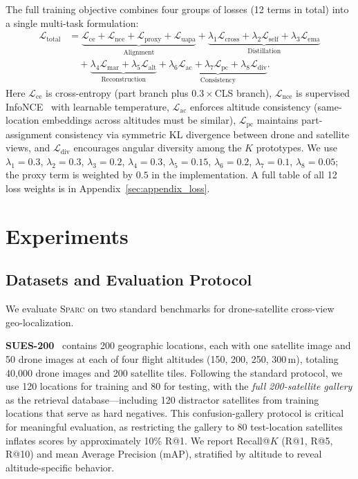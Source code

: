 \documentclass[sigconf, anonymous, review]{acmart}
\newcommand{\ours}{\textsc{Sparc}}
\newcommand{\loss}{\mathcal{L}}
\begin{document}
The full training objective combines four groups of losses (12 terms in total) into a single multi-task formulation:
\begin{equation}
\begin{aligned}
\loss_\text{total}
&= \underbrace{\loss_\text{ce} + \loss_\text{nce} + \loss_\text{proxy} + \loss_\text{uapa}}_{\text{Alignment}}
+ \underbrace{\lambda_1 \loss_\text{cross} + \lambda_2 \loss_\text{self} + \lambda_3 \loss_\text{ema}}_{\text{Distillation}} \\
&\quad + \underbrace{\lambda_4 \loss_\text{mar} + \lambda_5 \loss_\text{alt}}_{\text{Reconstruction}}
+ \underbrace{\lambda_6 \loss_\text{ac} + \lambda_7 \loss_\text{pc} + \lambda_8 \loss_\text{div}}_{\text{Consistency}}.
\end{aligned}
\label{eq:total}
\end{equation}
Here $\loss_\text{ce}$ is cross-entropy (part branch plus $0.3{\times}$CLS branch), $\loss_\text{nce}$ is supervised InfoNCE~\cite{oord2018infonce} with learnable temperature, $\loss_\text{ac}$ enforces altitude consistency (same-location embeddings across altitudes must be similar), $\loss_\text{pc}$ maintains part-assignment consistency via symmetric KL divergence between drone and satellite views, and $\loss_\text{div}$ encourages angular diversity among the $K$ prototypes. We use $\lambda_1{=}0.3$, $\lambda_2{=}0.3$, $\lambda_3{=}0.2$, $\lambda_4{=}0.3$, $\lambda_5{=}0.15$, $\lambda_6{=}0.2$, $\lambda_7{=}0.1$, $\lambda_8{=}0.05$; the proxy term is weighted by $0.5$ in the implementation. A full table of all 12 loss weights is in Appendix~\ref{sec:appendix_loss}.

\section{Experiments}
\label{sec:exp}

\subsection{Datasets and Evaluation Protocol}
\label{sec:datasets}

We evaluate \ours{} on two standard benchmarks for drone-satellite cross-view geo-localization.

\textbf{SUES-200}~\cite{zhu2023sues200} contains 200 geographic locations, each with one satellite image and 50 drone images at each of four flight altitudes (150, 200, 250, 300\,m), totaling 40{,}000 drone images and 200 satellite tiles.
Following the standard protocol, we use 120 locations for training and 80 for testing, with the \emph{full 200-satellite gallery} as the retrieval database---including 120 distractor satellites from training locations that serve as hard negatives.
This confusion-gallery protocol is critical for meaningful evaluation, as restricting the gallery to 80 test-location satellites inflates scores by approximately 10\% R@1.
We report Recall@$K$ (R@1, R@5, R@10) and mean Average Precision (mAP), stratified by altitude to reveal altitude-specific behavior.
\end{document}
